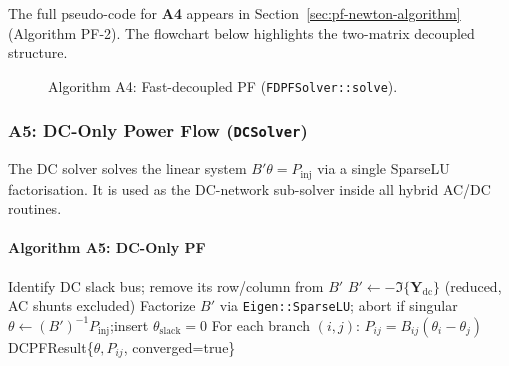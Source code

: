 The full pseudo-code for \textbf{A4} appears in Section~\ref{sec:pf-newton-algorithm}
(Algorithm PF-2).  The flowchart below highlights the two-matrix decoupled
structure.

\begin{figure}[H]
\centering
{}
\caption{Algorithm A4: Fast-decoupled PF (\texttt{FDPFSolver::solve}).}
\label{fig:a4-flow}
\end{figure}

\subsubsection{A5: DC-Only Power Flow (\texttt{DCSolver})}
\label{algo:a5}

The DC solver solves the linear system $B'\theta = P_\mathrm{inj}$ via a single
SparseLU factorisation.  It is used as the DC-network sub-solver inside all
hybrid AC/DC routines.

\paragraph{Algorithm A5: DC-Only PF}
\begin{algorithmic}[1]
  \State Identify DC slack bus; remove its row/column from $B'$
  \State $B' \gets -\Im\{\mathbf{Y}_\mathrm{dc}\}$ (reduced, AC shunts excluded)
  \State Factorize $B'$ via \texttt{Eigen::SparseLU}; abort if singular
  \State $\theta \gets (B')^{-1} P_\mathrm{inj}$;\quad insert $\theta_\mathrm{slack}=0$
  \State For each branch $(i,j)$: $P_{ij} = B_{ij}(\theta_i - \theta_j)$
  \State \Return DCPFResult\{$\theta, P_{ij}$, converged=true\}
\EndProcedure
\end{algorithmic}

